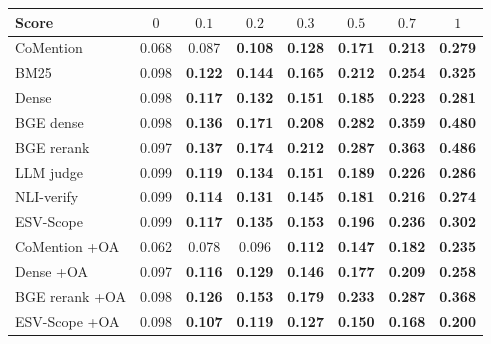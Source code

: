 \setlength{\tabcolsep}{2.5pt}
\begin{tabular}{lccccccc}
\toprule
Score & $0$ & $0.1$ & $0.2$ & $0.3$ & $0.5$ & $0.7$ & $1$ \\
\midrule
CoMention & 0.068 & 0.087 & \textbf{0.108} & \textbf{0.128} & \textbf{0.171} & \textbf{0.213} & \textbf{0.279} \\
BM25 & 0.098 & \textbf{0.122} & \textbf{0.144} & \textbf{0.165} & \textbf{0.212} & \textbf{0.254} & \textbf{0.325} \\
Dense & 0.098 & \textbf{0.117} & \textbf{0.132} & \textbf{0.151} & \textbf{0.185} & \textbf{0.223} & \textbf{0.281} \\
BGE dense & 0.098 & \textbf{0.136} & \textbf{0.171} & \textbf{0.208} & \textbf{0.282} & \textbf{0.359} & \textbf{0.480} \\
BGE rerank & 0.097 & \textbf{0.137} & \textbf{0.174} & \textbf{0.212} & \textbf{0.287} & \textbf{0.363} & \textbf{0.486} \\
LLM judge & 0.099 & \textbf{0.119} & \textbf{0.134} & \textbf{0.151} & \textbf{0.189} & \textbf{0.226} & \textbf{0.286} \\
NLI-verify & 0.099 & \textbf{0.114} & \textbf{0.131} & \textbf{0.145} & \textbf{0.181} & \textbf{0.216} & \textbf{0.274} \\
ESV-Scope & 0.099 & \textbf{0.117} & \textbf{0.135} & \textbf{0.153} & \textbf{0.196} & \textbf{0.236} & \textbf{0.302} \\
\midrule
CoMention +OA & 0.062 & 0.078 & 0.096 & \textbf{0.112} & \textbf{0.147} & \textbf{0.182} & \textbf{0.235} \\
Dense +OA & 0.097 & \textbf{0.116} & \textbf{0.129} & \textbf{0.146} & \textbf{0.177} & \textbf{0.209} & \textbf{0.258} \\
BGE rerank +OA & 0.098 & \textbf{0.126} & \textbf{0.153} & \textbf{0.179} & \textbf{0.233} & \textbf{0.287} & \textbf{0.368} \\
ESV-Scope +OA & 0.098 & \textbf{0.107} & \textbf{0.119} & \textbf{0.127} & \textbf{0.150} & \textbf{0.168} & \textbf{0.200} \\
\bottomrule
\end{tabular}
